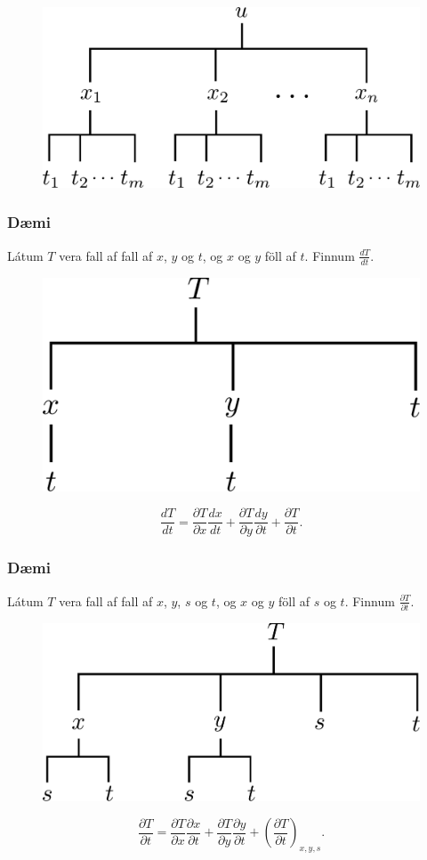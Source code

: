 \begin{figure}[h!]
           \centering
            \includegraphics[width=0.45\linewidth]{chain3}
	\caption*{}
    \end{figure}


\subsubsection{Dæmi }
Látum $T$ vera fall af fall af $x$, $y$ og $t$, og $x$ og $y$ föll af $t$. Finnum $\frac{ dT}{dt}$.

\begin{figure}[h!]
           \centering
            \includegraphics[width=0.35\linewidth]{chain5}
	\caption*{}
    \end{figure}
$$\frac{d T}{d t} = \frac{\partial T}{\partial x} \frac{d x}{d t} +\frac{\partial T}{\partial y} \frac{d y}{\partial t} + \frac{\partial T}{\partial t} .$$


\subsubsection{Dæmi }
Látum $T$ vera fall af fall af $x$, $y$, $s$ og $t$, og $x$ og $y$ föll af $s$ og $t$. Finnum $\frac{ \partial T}{\partial t}$.

\begin{figure}[h!]
           \centering
            \includegraphics[width=0.45\linewidth]{chain6}
	\caption*{}
    \end{figure}
$$\frac{\partial T}{\partial t} = \frac{\partial T}{\partial x} \frac{\partial x}{\partial t} +\frac{\partial T}{\partial y} \frac{\partial y}{\partial t} + \left(\frac{\partial T}{\partial t}\right)_{x,y,s} .$$


